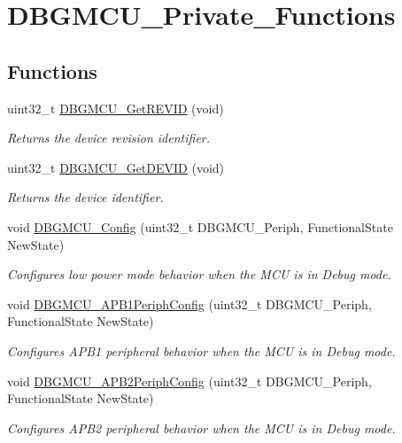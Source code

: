 \hypertarget{group___d_b_g_m_c_u___private___functions}{\section{D\-B\-G\-M\-C\-U\-\_\-\-Private\-\_\-\-Functions}
\label{group___d_b_g_m_c_u___private___functions}
}
\subsection*{Functions}
\begin{DoxyCompactItemize}
\item 
uint32\-\_\-t \hyperlink{group___d_b_g_m_c_u___private___functions_ga47419e9ca75ab7be4c70feb82faa0511}{D\-B\-G\-M\-C\-U\-\_\-\-Get\-R\-E\-V\-I\-D} (void)
\begin{DoxyCompactList}\small\item\em Returns the device revision identifier. \end{DoxyCompactList}\item 
uint32\-\_\-t \hyperlink{group___d_b_g_m_c_u___private___functions_gac34193c34dbce759bf424957a31b3266}{D\-B\-G\-M\-C\-U\-\_\-\-Get\-D\-E\-V\-I\-D} (void)
\begin{DoxyCompactList}\small\item\em Returns the device identifier. \end{DoxyCompactList}\item 
void \hyperlink{group___d_b_g_m_c_u___private___functions_gadf2f267f855ac1e4c03905c5dcfbd28b}{D\-B\-G\-M\-C\-U\-\_\-\-Config} (uint32\-\_\-t D\-B\-G\-M\-C\-U\-\_\-\-Periph, Functional\-State New\-State)
\begin{DoxyCompactList}\small\item\em Configures low power mode behavior when the M\-C\-U is in Debug mode. \end{DoxyCompactList}\item 
void \hyperlink{group___d_b_g_m_c_u___private___functions_ga71349f1435471f71979c742360df88f0}{D\-B\-G\-M\-C\-U\-\_\-\-A\-P\-B1\-Periph\-Config} (uint32\-\_\-t D\-B\-G\-M\-C\-U\-\_\-\-Periph, Functional\-State New\-State)
\begin{DoxyCompactList}\small\item\em Configures A\-P\-B1 peripheral behavior when the M\-C\-U is in Debug mode. \end{DoxyCompactList}\item 
void \hyperlink{group___d_b_g_m_c_u___private___functions_ga2f5ed438cada1be09ea51c42419be3a8}{D\-B\-G\-M\-C\-U\-\_\-\-A\-P\-B2\-Periph\-Config} (uint32\-\_\-t D\-B\-G\-M\-C\-U\-\_\-\-Periph, Functional\-State New\-State)
\begin{DoxyCompactList}\small\item\em Configures A\-P\-B2 peripheral behavior when the M\-C\-U is in Debug mode. \end{DoxyCompactList}\end{DoxyCompactItemize}


